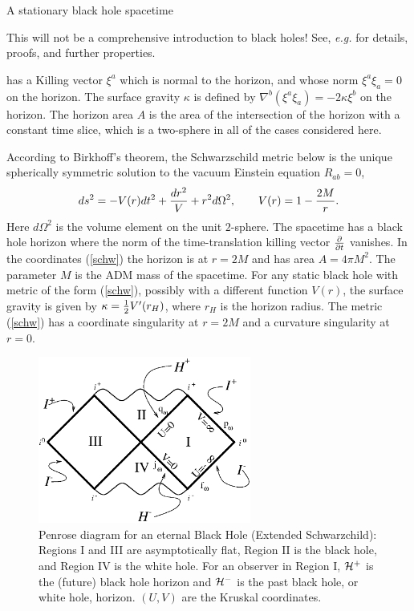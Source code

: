 \documentclass[12pt]{article}
\newcommand{\be}{\begin{equation}}
\newcommand{\ee}{\end{equation}}
\def\fh{{\cal H}^+}
\def\ph{{\cal H}^-}
\begin{document}
A stationary black hole spacetime\begin{footnote}
{This will not be a comprehensive introduction
to black holes! See, {\it e.g.} \cite{wald} for details, proofs, and
further properties.}\end{footnote}
has a
Killing vector $\xi^a$ which is normal to the horizon, and whose norm $\xi
^a \xi _a =0$ on the
horizon. The surface gravity $\kappa$ is defined by
$\nabla ^b (\xi ^a \xi _a )=-2\kappa \xi ^b$ on the horizon. The horizon area
$A$ is the area of the intersection of the horizon with a constant time
slice, which is a
two-sphere in all of the cases considered here.

According to Birkhoff's theorem, the Schwarzschild metric below is the
unique spherically
symmetric solution to the vacuum Einstein equation $R_{ab}=0$,
%
\be\label{schw}ds^2  = -V(r)dt^2 +{dr^2 \over V} +r^2
d\Omega ^2,\qquad V(r) = 1-{2M\over r}.\ee
%
Here $d\Omega ^2$ is the volume element on the unit $2$-sphere.  The
spacetime has a black
hole horizon where the norm of the time-translation
killing vector ${\partial \over \partial t}$ vanishes.  In
the  coordinates (\ref{schw}) the horizon is at $r=2M$ and has area $A=4\pi
M^2$.
The parameter $M$ is the ADM mass of the spacetime.  For any static black
hole with
metric of the form (\ref{schw}), possibly with a different function $V(r)$,
the surface
gravity is given by $\kappa ={1\over 2} V'(r_H )$, where $r_H$ is the
horizon radius. The
metric (\ref{schw})  has a coordinate singularity at $r=2M$ and a curvature
singularity at
$r=0$.
%
\begin{figure}[tb]
\begin{center}
\includegraphics[width=2.75in]{kruskal.eps}
\end{center}
\caption{Penrose diagram for an eternal Black Hole (Extended Schwarzchild):
Regions I and III are
asymptotically flat, Region II is the black hole, and Region IV is the
white hole.
For an observer in Region I, $\fh$ is the (future) black hole horizon and $\ph$
is the past black hole, or white hole, horizon. $(U,V)$ are the Kruskal
coordinates.}
\label{f3}
\end{figure}
%
\end{document}
